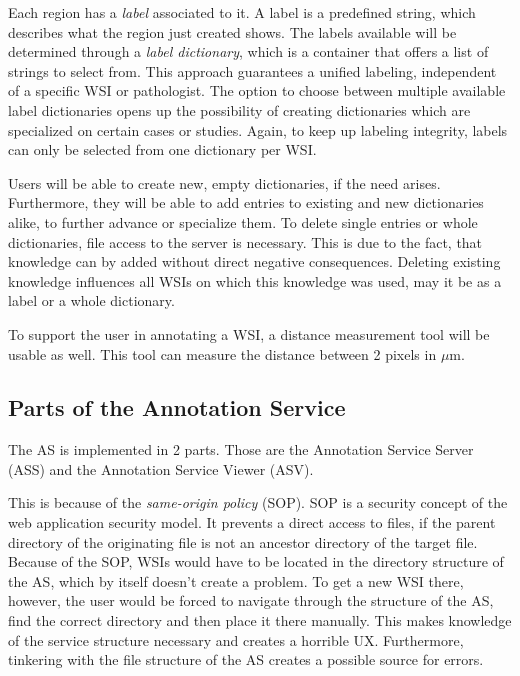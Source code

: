 Each region has a \emph{label} associated to it. A label is a predefined string, which describes what the region just created shows. The labels available will be determined through a \emph{label dictionary}, which is a container that offers a list of strings to select from. This approach guarantees a unified labeling, independent of a specific WSI or pathologist. The option to choose between multiple available label dictionaries opens up the possibility of creating dictionaries which are specialized on certain cases or studies. Again, to keep up labeling integrity, labels can only be selected from one dictionary per WSI.

Users will be able to create new, empty dictionaries, if the need arises. Furthermore, they will be able to add entries to existing and new dictionaries alike, to further advance or specialize them. To delete single entries or whole dictionaries, file access to the server is necessary. This is due to the fact, that knowledge can by added without direct negative consequences. Deleting existing knowledge influences all WSIs on which this knowledge was used, may it be as a label or a whole dictionary.

To support the user in annotating a WSI, a distance measurement tool will be usable as well. This tool can measure the distance between 2 pixels in $\mu$m.


\subsection{Parts of the Annotation Service}
The AS is implemented in 2 parts. Those are the Annotation Service Server (ASS) and the Annotation Service Viewer (ASV).

This is because of the \emph{same-origin policy} (SOP). SOP is a security concept of the web application security model. It prevents a direct access to files, if the parent directory of the originating file is not an ancestor directory of the target file\cite{web:mdn}. Because of the SOP, WSIs would have to be located in the directory structure of the AS, which by itself doesn't create a problem. To get a new WSI there, however, the user would be forced to navigate through the structure of the AS, find the correct directory and then place it there manually. This makes knowledge of the service structure necessary and creates a horrible UX. Furthermore, tinkering with the file structure of the AS creates a possible source for errors.

